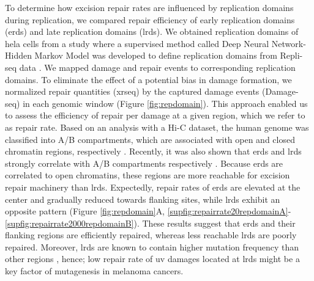 To determine how excision repair rates are influenced by replication domains during replication, we compared repair efficiency of early replication domains (\gls{erd}s) and late replication domains (\gls{lrd}s). We obtained replication domains of \gls{hela} cells from a study where a supervised method called Deep Neural Network-Hidden Markov Model was developed to define replication domains from Repli-seq data \citep{liu2016novo}. We mapped damage and repair events to corresponding replication domains. To eliminate the effect of a potential bias in damage formation, we normalized repair quantities (\gls{xrseq}) by the captured damage events (Damage-seq) in each genomic window (Figure \ref{fig:repdomain}). This approach enabled us to assess the efficiency of repair per damage at a given region, which we refer to as repair rate. Based on an analysis with a Hi-C dataset, the human genome was classified into A/B compartments, which are associated with open and closed chromatin regions, respectively \citep{lieberman2009comprehensive}. Recently, it was also shown that \gls{erd}s and \gls{lrd}s strongly correlate with A/B compartments respectively \citep{pope2014topologically,ryba2010evolutionarily}. Because \gls{erd}s are correlated to open chromatins, these regions are more reachable for excision repair machinery than \gls{lrd}s. Expectedly, repair rates of \gls{erd}s are elevated at the center and gradually reduced towards flanking sites, while \gls{lrd}s exhibit an opposite pattern (Figure \ref{fig:repdomain}A, \ref{supfig:repairrate20repdomainA}-\ref{supfig:repairrate2000repdomainB}). These results suggest that \gls{erd}s and their flanking regions are efficiently repaired, whereas less reachable \gls{lrd}s are poorly repaired. Moreover, \gls{lrd}s are known to contain higher mutation frequency than other regions \citep{lawrence2013mutational,stamatoyannopoulos2009human}, hence; low repair rate of \gls{uv} damages located at \gls{lrd}s might be a key factor of mutagenesis in melanoma cancers. 

